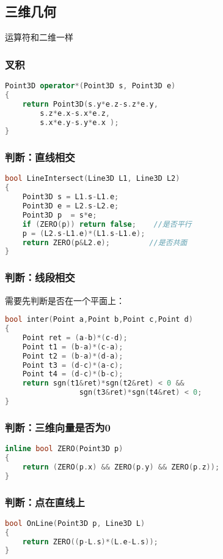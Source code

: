 \subsection{三维几何}
	运算符和二维一样
	\subsubsection{叉积}
	    \begin{lstlisting}[language=c++]
Point3D operator*(Point3D s, Point3D e)
{ 
	return Point3D(s.y*e.z-s.z*e.y, 
		s.z*e.x-s.x*e.z, 
		s.x*e.y-s.y*e.x ); 
}
	    \end{lstlisting}
	
	\subsubsection{判断：直线相交}
		\begin{lstlisting}[language=c++]
bool LineIntersect(Line3D L1, Line3D L2) 
{ 
	Point3D s = L1.s-L1.e; 
	Point3D e = L2.s-L2.e; 
	Point3D p  = s*e; 
	if (ZERO(p)) return false;	  //是否平行 
	p = (L2.s-L1.e)*(L1.s-L1.e); 
	return ZERO(p&L2.e);		 //是否共面 
} 
		\end{lstlisting}
		
	\subsubsection{判断：线段相交}
	需要先判断是否在一个平面上：
	\begin{lstlisting}[language=c++]
bool inter(Point a,Point b,Point c,Point d)
{
	Point ret = (a-b)*(c-d);
	Point t1 = (b-a)*(c-a);
	Point t2 = (b-a)*(d-a);
	Point t3 = (d-c)*(a-c);
	Point t4 = (d-c)*(b-c);
	return sgn(t1&ret)*sgn(t2&ret) < 0 &&
				 sgn(t3&ret)*sgn(t4&ret) < 0;
}
	\end{lstlisting}
	
	\subsubsection{判断：三维向量是否为0}
		\begin{lstlisting}[language=c++]
inline bool ZERO(Point3D p)
{ 
	return (ZERO(p.x) && ZERO(p.y) && ZERO(p.z)); 
} 
		\end{lstlisting}
				
	\subsubsection{判断：点在直线上}
		\begin{lstlisting}[language=c++]
bool OnLine(Point3D p, Line3D L)
{ 
	return ZERO((p-L.s)*(L.e-L.s)); 
} 
		\end{lstlisting}
		

